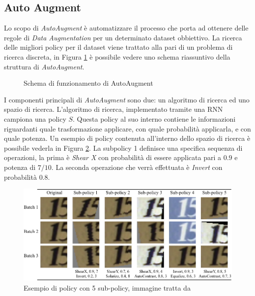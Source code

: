 \subsection{Auto Augment}
\label{subsec:auto_augment}
Lo scopo di \textit{AutoAugment} \cite{DBLP:journals/corr/abs-1805-09501} è automatizzare il processo che porta ad ottenere delle regole di \textit{Data Augmentation} per un determinato dataset obbiettivo. La ricerca delle migliori policy per il dataset viene trattato alla pari di un problema di ricerca discreta, in Figura \ref{fig:AutoAugment} è possibile vedere uno schema riassuntivo della struttura di \textit{AutoAugment}.
\begin{figure}
    \centering
    \caption{Schema di funzionamento di AutoAugment}
    \label{fig:AutoAugment}
\end{figure}
I componenti principali di \textit{AutoAugment} sono due: un algoritmo di ricerca ed uno spazio di ricerca. 
L'algoritmo di ricerca, implementato tramite una \ac{RNN} campiona una policy $S$. Questa policy al suo interno contiene le informazioni riguardanti quale trasformazione applicare, con quale probabilità applicarla, e con quale potenza. Un esempio di policy contenuta all'interno dello spazio di ricerca è possibile vederla in Figura \ref{fig:policy}. La subpolicy 1 definisce una specifica sequenza di operazioni, la prima è \textit{Shear X} con probabilità di essere applicata pari a $0.9$ e potenza di $7/10$. La seconda operazione che verrà effettuata è \textit{Invert} con probabilità $0.8$. 
\begin{figure}[]
    \centering
    \includegraphics[width=\textwidth]{images/svhn_viz_policy2.png}
    \caption{Esempio di policy con 5 sub-policy, immagine tratta da \cite{DBLP:journals/corr/abs-1805-09501}}
    \label{fig:policy}
\end{figure} 


